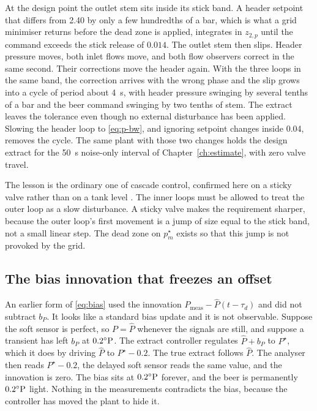 At the design point the outlet stem sits inside its stick band. A header setpoint that differs from \SI{2.40}{\barg} by only a few hundredths of a bar, which is what a grid minimiser returns before the dead zone is applied, integrates in $z_{2,p}$ until the command exceeds the stick release of $0.014$. The outlet stem then slips. Header pressure moves, both inlet flows move, and both flow observers correct in the same second. Their corrections move the header again. With the three loops in the same band, the correction arrives with the wrong phase and the slip grows into a cycle of period about \SI{4}{s}, with header pressure swinging by several tenths of a bar and the beer command swinging by two tenths of stem. The extract leaves the tolerance even though no external disturbance has been applied. Slowing the header loop to \eqref{eq:p-bw}, and ignoring setpoint changes inside \SI{0.04}{\barg}, removes the cycle. The same plant with those two changes holds the design extract for the \SI{50}{s} noise-only interval of Chapter~\ref{ch:estimate}, with zero valve travel.

The lesson is the ordinary one of cascade control, confirmed here on a sticky valve rather than on a tank level \cite{seborg2016process,luyben1990process,astrom2008feedback}. The inner loops must be allowed to treat the outer loop as a slow disturbance. A sticky valve makes the requirement sharper, because the outer loop's first movement is a jump of size equal to the stick band, not a small linear step. The dead zone on $p_m^\star$ exists so that this jump is not provoked by the grid.

\subsection{The bias innovation that freezes an offset}

An earlier form of \eqref{eq:bias} used the innovation $P_{\mathrm{meas}}-\hat{P}(t-\tau_d)$ and did not subtract $b_P$. It looks like a standard bias update and it is not observable. Suppose the soft sensor is perfect, so $P=\hat{P}$ whenever the signals are still, and suppose a transient has left $b_P$ at $0.2^{\circ}\mathrm{P}$. The extract controller regulates $\hat{P}+b_P$ to $P^\star$, which it does by driving $\hat{P}$ to $P^\star-0.2$. The true extract follows $\hat{P}$. The analyser then reads $P^\star-0.2$, the delayed soft sensor reads the same value, and the innovation is zero. The bias sits at $0.2^{\circ}\mathrm{P}$ forever, and the beer is permanently $0.2^{\circ}\mathrm{P}$ light. Nothing in the measurements contradicts the bias, because the controller has moved the plant to hide it.


